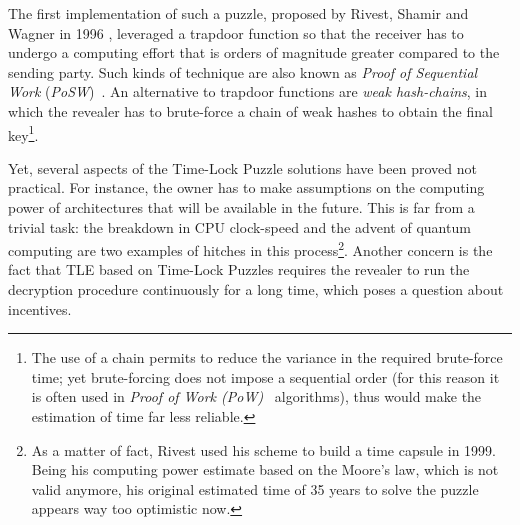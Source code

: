 
The first implementation of such a puzzle,
%
proposed by Rivest, Shamir and Wagner in 1996 \cite{Rivest:1996:TPT:888615},
%
leveraged a trapdoor function
so that the receiver has to undergo a computing effort that is orders of magnitude greater compared to the sending party.
%
Such kinds of technique are also known as {\em Proof of Sequential Work} ({\em PoSW})~\cite{posw,cohen2018}.
An alternative to trapdoor functions are {\em weak hash-chains}, in which the revealer has to brute-force a chain of weak hashes to obtain the final key\footnote{
The use of a chain permits to reduce the variance in the required brute-force time; yet brute-forcing does not impose a sequential order (for this reason it is often used in {\em Proof of Work (PoW)}~\cite{pow} algorithms), thus would make the estimation of time far less reliable.
}.

Yet, several aspects of the Time-Lock Puzzle solutions have been proved not practical. For instance, 
%
the owner has to make assumptions on the computing power of architectures that will be available in the future. This is far from a trivial task: the breakdown in CPU clock-speed and the advent of quantum computing are two examples of hitches in this process\footnote{As a matter of fact, Rivest used his scheme to build a time capsule in 1999. Being his computing power estimate based on the Moore's law, which is not valid anymore, his original estimated time of 35 years to solve the puzzle appears way too optimistic now.}.
%
Another concern is the fact that TLE based on Time-Lock Puzzles requires the revealer to run the decryption procedure continuously for a long time, which poses a question about incentives.

